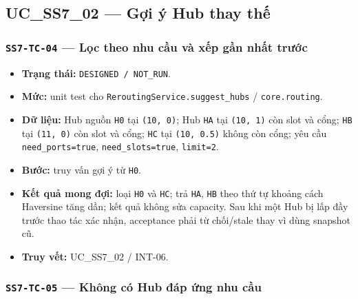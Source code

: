 \documentclass[11pt,a4paper]{article}
\providecommand{\tightlist}{%
  \setlength{\itemsep}{0pt}\setlength{\parskip}{0pt}}
\begin{document}
\hypertarget{uc_ss7_02-gux1ee3i-uxfd-hub-thay-thux1ebf}{%
\subsection{UC\_SS7\_02 --- Gợi ý Hub thay
thế}\label{uc_ss7_02-gux1ee3i-uxfd-hub-thay-thux1ebf}}

\hypertarget{ss7-tc-04-lux1ecdc-theo-nhu-cux1ea7u-vuxe0-xux1ebfp-gux1ea7n-nhux1ea5t-trux1b0ux1edbc}{%
\subsubsection{\texorpdfstring{\texttt{SS7-TC-04} --- Lọc theo nhu cầu
và xếp gần nhất
trước}{SS7-TC-04 --- Lọc theo nhu cầu và xếp gần nhất trước}}\label{ss7-tc-04-lux1ecdc-theo-nhu-cux1ea7u-vuxe0-xux1ebfp-gux1ea7n-nhux1ea5t-trux1b0ux1edbc}}

\begin{itemize}
\tightlist
\item
  \textbf{Trạng thái:} \texttt{DESIGNED\ /\ NOT\_RUN}.
\item
  \textbf{Mức:} unit test cho \texttt{ReroutingService.suggest\_hubs} /
  \texttt{core.routing}.
\item
  \textbf{Dữ liệu:} Hub nguồn \texttt{H0} tại \texttt{(10,\ 0)}; Hub
  \texttt{HA} tại \texttt{(10,\ 1)} còn slot và cổng; \texttt{HB} tại
  \texttt{(11,\ 0)} còn slot và cổng; \texttt{HC} tại
  \texttt{(10,\ 0.5)} không còn cổng; yêu cầu \texttt{need\_ports=true},
  \texttt{need\_slots=true}, \texttt{limit=2}.
\item
  \textbf{Bước:} truy vấn gợi ý từ \texttt{H0}.
\item
  \textbf{Kết quả mong đợi:} loại \texttt{H0} và \texttt{HC}; trả
  \texttt{HA}, \texttt{HB} theo thứ tự khoảng cách Haversine tăng dần;
  kết quả không sửa capacity. Sau khi một Hub bị lấp đầy trước thao tác
  xác nhận, acceptance phải từ chối/stale thay vì dùng snapshot cũ.
\item
  \textbf{Truy vết:} UC\_SS7\_02 / INT-06.
\end{itemize}

\hypertarget{ss7-tc-05-khuxf4ng-cuxf3-hub-ux111uxe1p-ux1ee9ng-nhu-cux1ea7u}{%
\subsubsection{\texorpdfstring{\texttt{SS7-TC-05} --- Không có Hub đáp
ứng nhu
cầu}{SS7-TC-05 --- Không có Hub đáp ứng nhu cầu}}\label{ss7-tc-05-khuxf4ng-cuxf3-hub-ux111uxe1p-ux1ee9ng-nhu-cux1ea7u}}
\end{document}
